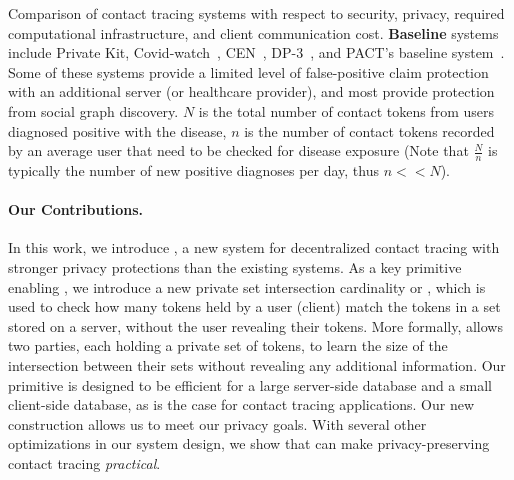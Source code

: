 \begin{table}[]
	\caption{Comparison of contact tracing systems with respect to security, privacy, required computational infrastructure, and client communication cost. \textbf{Baseline} systems include Private Kit\cite{PrivateKit}, Covid-watch~\cite{Covid-watch}, CEN~\cite{CEN}, DP-3~\cite{DP-3T}, and PACT's baseline system~\cite{chan2020pact}. Some of these systems provide a limited level of false-positive claim protection with an additional server (or healthcare provider), and most provide protection from social graph discovery.  $N$ is the total number of contact tokens from users diagnosed positive with the disease, $n$ is the number of contact tokens recorded by an average user that need to be checked for disease exposure (Note that $\frac{N}{n}$ is typically the number of new positive diagnoses per day, thus $n<<N$).}
	
	\label{tbl:comp-complx}
\end{table}


\paragraph{Our Contributions.}

In this work, we introduce \dect, a new system for decentralized contact tracing with stronger privacy protections than the existing systems. As a key primitive enabling \dect, we introduce a new private set intersection cardinality or \psica, which is used to check how many tokens held by a user (client) match the tokens in a set stored on a server, without the user revealing their tokens. More formally, \psica allows two parties, each holding a private set of tokens, to learn the size of the intersection between their sets without revealing any additional information. Our \psica primitive is designed to be efficient for a large server-side database and a small client-side database, as is the case for contact tracing applications. 
Our new \psica construction allows us to meet our privacy goals.  With several other optimizations in our system design, we show that \psica can make privacy-preserving contact tracing \emph{practical}. 

